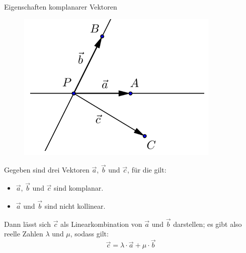 \begin{theorem}{Eigenschaften komplanarer Vektoren}\\
    \begin{figure}
        \vspace{-10pt}
        \includegraphics[width=\linewidth]{vec-kompl.png}
    \end{figure}
    Gegeben sind drei Vektoren $\vec{a}$, $\vec{b}$ und $\vec{c}$, für die gilt:
    \begin{itemize}
        \item $\vec{a}$, $\vec{b}$ und $\vec{c}$ sind komplanar.
        \item $\vec{a}$ und $\vec{b}$ sind nicht kollinear.
    \end{itemize} 
    Dann lässt sich $\vec{c}$ als Linearkombination von $\vec{a}$ und $\vec{b}$ darstellen; 
    es gibt also reelle Zahlen $\lambda$ und $\mu$, sodass gilt:
    \begin{equation*}
        \vec{c}=\lambda\cdot\vec{a}+\mu\cdot\vec{b}
    \end{equation*}
\end{theorem}

